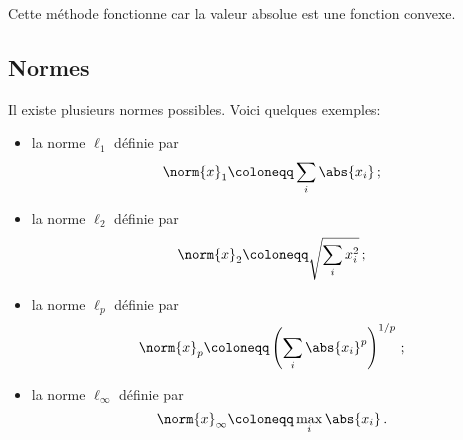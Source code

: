 	Cette méthode fonctionne car la valeur absolue est une fonction convexe.

\subsection{Normes}

	Il existe plusieurs normes possibles.
	Voici quelques exemples:

	\begin{itemize}
		\item la norme $\ell_1$ définie par
		\[
		\norm{x}_1 \coloneqq \sum_i \abs{x_i}\,;
		\]
		\item la norme $\ell_2$ définie par
		\[
		\norm{x}_2 \coloneqq \sqrt{\sum_i x_i^2}\,;
		\]
		\item la norme $\ell_p$ définie par
		\[
		\norm{x}_p \coloneqq \left(\sum_i \abs{x_i}^p\right)^{1/p}\,;
		\]
		\item la norme $\ell_\infty$ définie par
		\[
		\norm{x}_\infty \coloneqq \max_i \abs{x_i}\,.
		\]
	\end{itemize}
